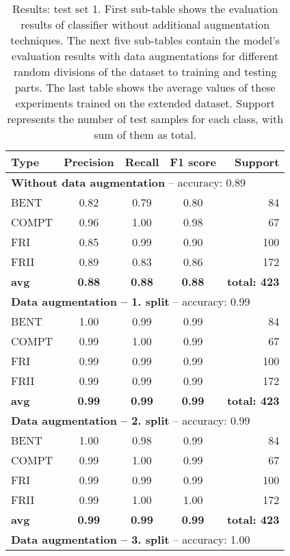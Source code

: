 \documentclass[fleqn,usenatbib]{mnras}
\begin{document}
\begin{table}
	\centering
	\caption{Results: test set 1. First sub-table shows the evaluation results of classifier without additional augmentation techniques. The next five sub-tables contain the model's evaluation results with data augmentations for different random divisions of the dataset to training and testing parts. The last table shows the average values of these experiments trained on the extended dataset. Support represents the number of test samples for each class, with sum of them as total.}
	\label{tab:result}
	\begin{tabular}{lcccr} 
		\hline
	    \textbf{Type} & \textbf{Precision} & \textbf{Recall} & \textbf{F1 score} &  \textbf{Support} \\ 
	    \hline
		\multicolumn{5}{l}{\textbf{Without data augmentation} -- accuracy: 0.89}   \\ \hline
		BENT & 0.82 & 0.79 &  0.80 & 84\\
		COMPT & 0.96 & 1.00 &  0.98  &67 \\
		FRI & 0.85 &  0.99&  0.90 & 100\\
		FRII & 0.89 &0.83 & 0.86 & 172\\
		\hline
		\textbf{avg} & \textbf{0.88}  &\textbf{ 0.88} & \textbf{0.88} & \textbf{total: 423}\\
		\hline \hline
		\multicolumn{5}{l}{\textbf{Data augmentation -- 1. split} -- accuracy: 0.99}   \\ \hline
		BENT & 1.00 & 0.99 &  0.99 & 84\\
		COMPT & 0.99 & 1.00 &  0.99  &67 \\
		FRI & 0.99 &  0.99&  0.99 & 100\\
		FRII & 0.99 &0.99  & 0.99 & 172\\
		\hline
		\textbf{avg} & \textbf{0.99}  &\textbf{ 0.99} & \textbf{0.99} & \textbf{total: 423}\\
		\hline
		\multicolumn{5}{l}{\textbf{Data augmentation -- 2. split} -- accuracy: 0.99}   \\ \hline
	    BENT & 1.00 & 0.98& 0.99  & 84\\
		COMPT & 0.99 & 1.00 &  0.99  &67 \\
		FRI & 0.99 & 0.99 &  0.99 & 100\\
		FRII & 0.99 &1.00  & 1.00 & 172\\
		\hline
		\textbf{avg} &  \textbf{0.99} & \textbf{0.99} & \textbf{0.99} & \textbf{total: 423}\\
		\hline
		\multicolumn{5}{l}{\textbf{Data augmentation -- 3. split} -- accuracy: 1.00}   \\ \hline

\end{tabular}
\end{table}
\end{document}
